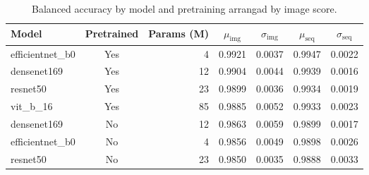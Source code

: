 \begin{table}
\caption{Balanced accuracy by model and pretraining arrangad by image score.}
\label{tab:bal_acc_by_model}
\begin{tabular}{l c r c c c c}
\toprule
Model & Pretrained & Params (M) & $\mu_{\mathrm{img}}$ & $\sigma_{\mathrm{img}}$ & $\mu_{\mathrm{seq}}$ & $\sigma_{\mathrm{seq}}$ \\
\midrule
efficientnet_b0 & Yes & 4 & 0.9921 & 0.0037 & 0.9947 & 0.0022 \\
densenet169 & Yes & 12 & 0.9904 & 0.0044 & 0.9939 & 0.0016 \\
resnet50 & Yes & 23 & 0.9899 & 0.0036 & 0.9934 & 0.0019 \\
vit_b_16 & Yes & 85 & 0.9885 & 0.0052 & 0.9933 & 0.0023 \\
densenet169 & No & 12 & 0.9863 & 0.0059 & 0.9899 & 0.0017 \\
efficientnet_b0 & No & 4 & 0.9856 & 0.0049 & 0.9898 & 0.0026 \\
resnet50 & No & 23 & 0.9850 & 0.0035 & 0.9888 & 0.0033 \\
\bottomrule
\end{tabular}
\end{table}

